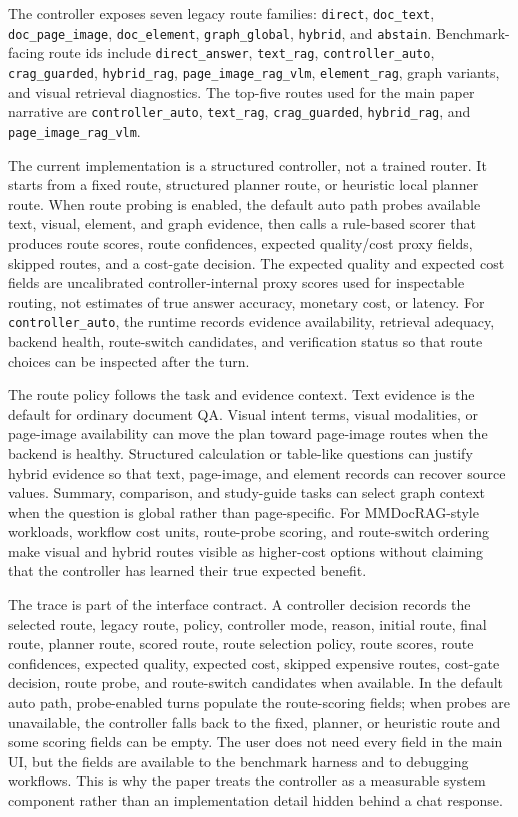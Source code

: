 The controller exposes seven legacy route families: \texttt{direct}, \texttt{doc\_text}, \texttt{doc\_page\_image}, \texttt{doc\_element}, \texttt{graph\_global}, \texttt{hybrid}, and \texttt{abstain}. Benchmark-facing route ids include \texttt{direct\_answer}, \texttt{text\_rag}, \texttt{controller\_auto}, \texttt{crag\_guarded}, \texttt{hybrid\_rag}, \texttt{page\_image\_rag\_vlm}, \texttt{element\_rag}, graph variants, and visual retrieval diagnostics. The top-five routes used for the main paper narrative are \texttt{controller\_auto}, \texttt{text\_rag}, \texttt{crag\_guarded}, \texttt{hybrid\_rag}, and \texttt{page\_image\_rag\_vlm}.

The current implementation is a structured controller, not a trained router. It starts from a fixed route, structured planner route, or heuristic local planner route. When route probing is enabled, the default auto path probes available text, visual, element, and graph evidence, then calls a rule-based scorer that produces route scores, route confidences, expected quality/cost proxy fields, skipped routes, and a cost-gate decision. The expected quality and expected cost fields are uncalibrated controller-internal proxy scores used for inspectable routing, not estimates of true answer accuracy, monetary cost, or latency. For \texttt{controller\_auto}, the runtime records evidence availability, retrieval adequacy, backend health, route-switch candidates, and verification status so that route choices can be inspected after the turn.

The route policy follows the task and evidence context. Text evidence is the default for ordinary document QA. Visual intent terms, visual modalities, or page-image availability can move the plan toward page-image routes when the backend is healthy. Structured calculation or table-like questions can justify hybrid evidence so that text, page-image, and element records can recover source values. Summary, comparison, and study-guide tasks can select graph context when the question is global rather than page-specific. For MMDocRAG-style workloads, workflow cost units, route-probe scoring, and route-switch ordering make visual and hybrid routes visible as higher-cost options without claiming that the controller has learned their true expected benefit.

The trace is part of the interface contract. A controller decision records the selected route, legacy route, policy, controller mode, reason, initial route, final route, planner route, scored route, route selection policy, route scores, route confidences, expected quality, expected cost, skipped expensive routes, cost-gate decision, route probe, and route-switch candidates when available. In the default auto path, probe-enabled turns populate the route-scoring fields; when probes are unavailable, the controller falls back to the fixed, planner, or heuristic route and some scoring fields can be empty. The user does not need every field in the main UI, but the fields are available to the benchmark harness and to debugging workflows. This is why the paper treats the controller as a measurable system component rather than an implementation detail hidden behind a chat response.

